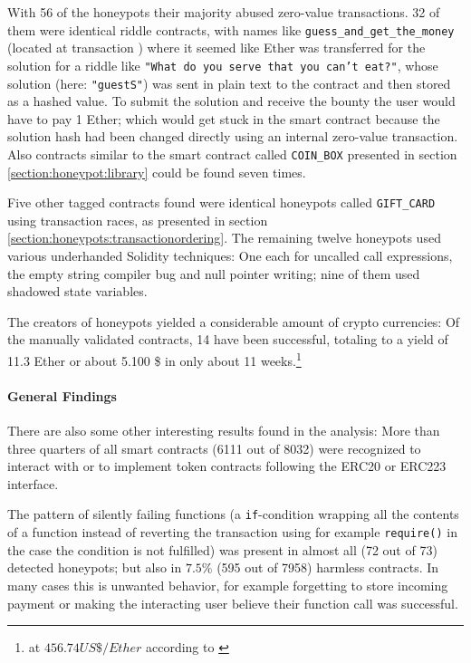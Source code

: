 {With 56 of the honeypots their majority  abused zero-value transactions. 32 of them were identical riddle contracts, with names like \texttt{guess_and_get_the_money} (located at transaction \cite{etherscan:riddle}) where it seemed like Ether was transferred for the solution for a riddle like \texttt{"What do you serve that you can’t eat?"}, whose solution (here: \texttt{"guestS"}) was sent in plain text to the contract and then stored as a hashed value. To submit the solution and receive the bounty the user would have to pay 1 Ether; which would get stuck in the smart contract because the solution hash had been changed directly using an internal zero-value transaction. Also contracts similar to the smart contract called \texttt{COIN_BOX} presented in section \ref{section:honeypot:library} could be found seven times.

Five other tagged contracts found were identical honeypots called \texttt{GIFT_CARD} using transaction races, as presented in section \ref{section:honeypots:transactionordering}. The remaining twelve honeypots used various underhanded Solidity techniques: One each for uncalled call expressions, the empty string compiler bug and null pointer writing; nine of them used shadowed state variables.

The creators of honeypots yielded a considerable amount of crypto currencies: Of the manually validated contracts, 14 have been successful, totaling to a yield of 11.3 Ether or about 5.100 \$ in only about 11 weeks.\footnote{at \( 456.74 US\$ / Ether \) according to \cite{coinmarketcap:overview}}

\paragraph{General Findings}
There are also some other interesting results found in the analysis: More than three quarters of all smart contracts (6111 out of 8032) were recognized to interact with or to implement token contracts following the ERC20 or ERC223 interface.

The pattern of silently failing functions (a \texttt{if}-condition wrapping all the contents of a function instead of reverting the transaction using for example \texttt{require()} in the case the condition is not fulfilled) was present in almost all (72 out of 73) detected honeypots; but also in \( 7.5 \% \) (595 out of 7958) harmless contracts. In many cases this is unwanted behavior, for example forgetting to store  incoming payment or making the interacting user believe their function call was successful.

}
